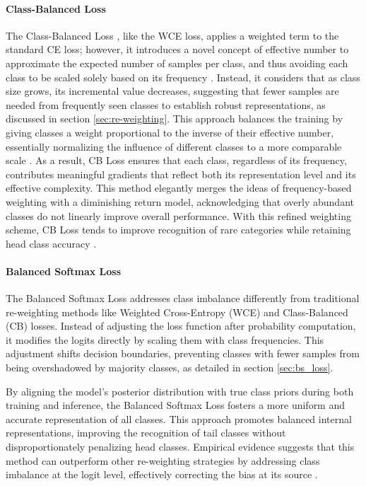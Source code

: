 \paragraph{Class-Balanced Loss}
The Class-Balanced Loss \cite{cui2019classbalancedlossbasedeffective}, like the WCE loss, applies a weighted term to the standard CE loss; however, it introduces a novel concept of effective number to approximate the expected number of samples per class, and thus avoiding each class to be scaled solely based on its frequency \cite{zhang2023deep,cui2019classbalancedlossbasedeffective}. Instead, it considers that as class size grows, its incremental value decreases, suggesting that fewer samples are needed from frequently seen classes to establish robust representations, as discussed in section \ref{sec:re-weighting}. This approach balances the training by giving classes a weight proportional to the inverse of their effective number, essentially normalizing the influence of different classes to a more comparable scale \cite{zhang2023deep}. As a result, CB Loss ensures that each class, regardless of its frequency, contributes meaningful gradients that reflect both its representation level and its effective complexity. This method elegantly merges the ideas of frequency-based weighting with a diminishing return model, acknowledging that overly abundant classes do not linearly improve overall performance. With this refined weighting scheme, CB Loss tends to improve recognition of rare categories while retaining head class accuracy \cite{cui2019classbalancedlossbasedeffective}. 

\paragraph{Balanced Softmax Loss}
The Balanced Softmax Loss \cite{ren2020balancedmetasoftmaxlongtailedvisual} addresses class imbalance differently from traditional re-weighting methods like Weighted Cross-Entropy (WCE) and Class-Balanced (CB) losses. Instead of adjusting the loss function after probability computation, it modifies the logits directly by scaling them with class frequencies. This adjustment shifts decision boundaries, preventing classes with fewer samples from being overshadowed by majority classes, as detailed in section \ref{sec:bs_loss}.

By aligning the model's posterior distribution with true class priors during both training and inference, the Balanced Softmax Loss fosters a more uniform and accurate representation of all classes. This approach promotes balanced internal representations, improving the recognition of tail classes without disproportionately penalizing head classes. Empirical evidence suggests that this method can outperform other re-weighting strategies by addressing class imbalance at the logit level, effectively correcting the bias at its source \cite{ren2020balancedmetasoftmaxlongtailedvisual}.

